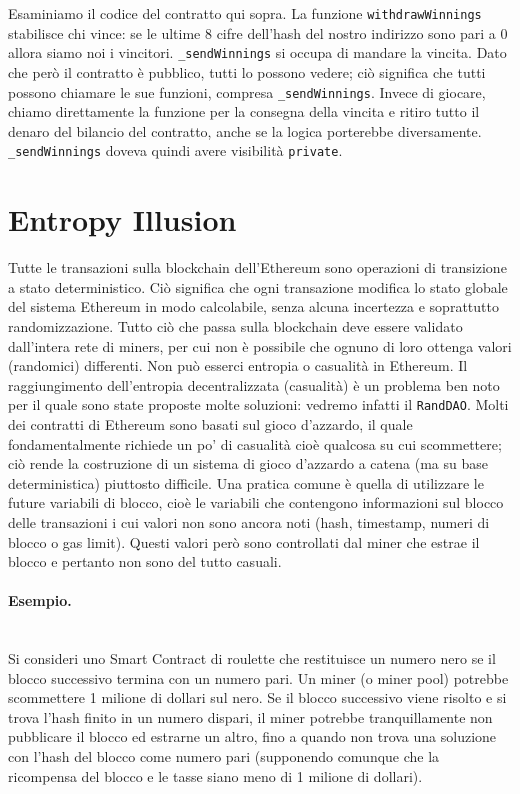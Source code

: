 Esaminiamo il codice del contratto qui sopra.
La funzione \verb|withdrawWinnings| stabilisce chi
vince: se le ultime 8 cifre dell'hash
del nostro indirizzo sono pari a $0$
allora siamo noi i vincitori.
\verb|_sendWinnings| si occupa di
mandare la vincita.
Dato che però il contratto è
pubblico, tutti lo possono vedere;
ciò significa che tutti possono chiamare le sue funzioni, compresa
\verb|_sendWinnings|.
Invece di giocare, chiamo direttamente la funzione per la consegna della vincita e
ritiro tutto
il denaro del bilancio del contratto, anche se la logica porterebbe diversamente.
\verb|_sendWinnings| doveva quindi avere visibilità \verb|private|.

\section{Entropy Illusion}

Tutte le transazioni sulla blockchain dell'Ethereum sono operazioni di
transizione a stato deterministico. Ciò significa che ogni transazione
modifica lo stato globale del sistema
Ethereum in modo calcolabile, senza alcuna incertezza e soprattutto randomizzazione.
Tutto ciò che passa sulla blockchain deve essere validato dall'intera rete di
miners, per cui non è
possibile che ognuno di loro ottenga valori (randomici) differenti.
Non può esserci entropia o
casualità in Ethereum.
Il raggiungimento dell'entropia decentralizzata (casualità) è un problema ben noto
per il
quale sono state proposte molte soluzioni: vedremo infatti il \verb|RandDAO|.
Molti dei contratti di Ethereum sono basati sul gioco d'azzardo, il quale
fondamentalmente
richiede un po' di casualità cioè qualcosa su cui scommettere;
ciò rende la costruzione di un
sistema di gioco d'azzardo a catena (ma su base deterministica) piuttosto difficile.
Una pratica comune è quella di utilizzare le future variabili di blocco,
cioè le variabili che
contengono informazioni sul blocco delle transazioni i cui valori non sono ancora
noti (hash, timestamp, numeri di blocco o gas limit).
Questi valori però sono controllati dal miner che
estrae il blocco e pertanto non sono del tutto casuali.

\paragraph{Esempio.}\ \\

Si consideri uno Smart Contract di roulette che restituisce un numero nero se il
blocco successivo termina con un numero pari.
Un miner (o miner pool) potrebbe scommettere 1 milione di dollari sul nero.
Se il blocco
successivo viene risolto e si trova l'hash finito in un numero dispari,
il miner potrebbe
tranquillamente non pubblicare il blocco ed estrarne un altro,
fino a quando non trova una
soluzione con l'hash del blocco come numero pari (supponendo comunque che la
ricompensa del blocco e le tasse siano meno di 1 milione di dollari).

